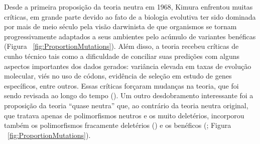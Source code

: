 \begin{refsection}
   
   
   Desde a primeira proposição da teoria neutra em 1968, Kimura enfrentou muitas críticas, em grande parte devido ao fato de a biologia evolutiva ter sido dominada por mais de meio século pela visão darwinista de que organismos se tornam progressivamente adaptados a seus ambientes pelo acúmulo de variantes benéficas (Figura ~\ref{fig:ProportionMutations}). Além disso, a teoria recebeu críticas de cunho técnico tais como a dificuldade de conciliar suas predições com alguns aspectos importantes dos dados gerados: variância elevada em taxas de evolução molecular, viés no uso de códons, evidência de seleção em estudo de genes específicos, entre outros. Essas críticas forçaram mudanças na teoria, que foi sendo revisada ao longo do tempo (\cite{Kimura1968,Kimura1983,Kimura1991}). Um outro desdobramento interessante foi a proposição da teoria \enquote{quase neutra} que, ao contrário da teoria neutra original, que tratava apenas de polimorfismos neutros e os muito deletérios, incorporou também os polimorfismos fracamente deletérios (\cite{Ohta1973SlightlyEvolution}) e os benéficos (\cite{Ohta1995,Ohta1996}; Figura ~\ref{fig:ProportionMutations}).
%




\end{refsection}
